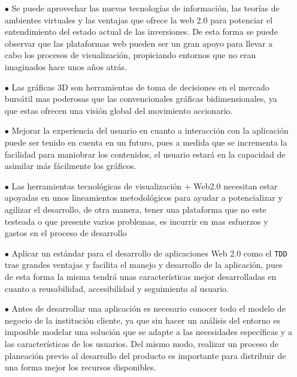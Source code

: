 \documentclass[twocolumn]{article}
\begin{document}
\begin{itemize}

\item[$\bullet$] Se puede aprovechar las nuevas tecnologías de información, las teorías de ambientes virtuales y las ventajas que ofrece la web 2.0 para potenciar el entendimiento del estado actual de las inversiones. De esta forma se puede observar que las plataformas web pueden ser un gran apoyo para llevar a cabo los procesos de visualización, propiciando entornos que no eran imaginados hace unos años atrás.

\item[$\bullet$] Las gráficas 3D son herramientas de toma de decisiones en el mercado bursátil mas poderosas que las convencionales gráficas bidimensionales, ya que estas ofrecen una visión global del movimiento accionario.

\item[$\bullet$] Mejorar la experiencia del usuario en cuanto a interacción con la aplicación puede ser tenido en cuenta en un futuro, pues a medida que se incrementa la facilidad para maniobrar los contenidos, el usuario estará en la capacidad de asimilar más fácilmente los gráficos.

\item[$\bullet$] Las herramientas tecnológicas de visualización + Web2.0 necesitan estar apoyadas en unos lineamientos metodológicos para ayudar a potencializar y agilizar el desarrollo, de otra manera, tener una plataforma que no este testeada o que presente varios problemas, es incurrir en mas esfuerzos y gastos en el proceso de desarrollo

\item[$\bullet$] Aplicar un estándar para el desarrollo de aplicaciones Web 2.0 como el \texttt{TDD} trae grandes ventajas y facilita el manejo y desarrollo de la aplicación, pues de esta forma la misma tendrá unas características mejor desarrolladas en cuanto a reusabilidad, accesibilidad y seguimiento al usuario.

\item[$\bullet$] Antes de desarrollar una aplicación es necesario conocer todo el modelo de negocio de la institución cliente, ya que sin hacer un análisis del entorno es imposible modelar una solución que se adapte a las necesidades específicas y a las características de los usuarios. Del mismo modo, realizar un proceso de planeación previo al desarrollo del producto es importante para distribuir de una forma mejor los recursos disponibles.


\end{itemize}
\end{document}
